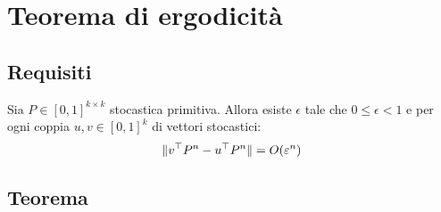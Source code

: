 \section{Teorema di ergodicità}


\subsection{Requisiti}
\begin{prop}\label{prop:stocconv}
	Sia $P\in[0,1]^{k\times k}$ stocastica primitiva. Allora esiste $\epsilon$ tale che $0\le\epsilon<1$ e per ogni coppia $u,v\in[0,1]^k$ di vettori stocastici:
	\begin{equation*}
		\|v^\top P^n-u^\top P^n\| = O(\varepsilon^n)
	\end{equation*}
\end{prop}


\subsection{Teorema}

